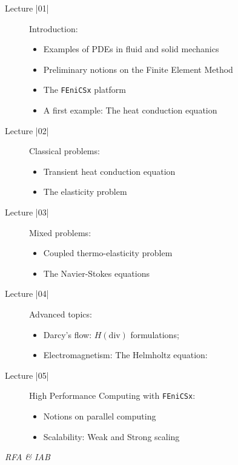 \begin{description}
	\item[Lecture |01|] Introduction:
	\begin{itemize}
		\item Examples of PDEs in fluid and solid mechanics
		\item Preliminary notions on the Finite Element Method
		\item The \texttt{FEniCSx} platform
		\item A first example: The heat conduction equation
	\end{itemize}
	
	\item[Lecture |02|] Classical problems:
	\begin{itemize}
		\item Transient heat conduction equation
		\item The elasticity problem
	\end{itemize}
	
	\item[Lecture |03|] Mixed problems:
	\begin{itemize}
		\item Coupled thermo-elasticity problem
		\item The Navier-Stokes equations
	\end{itemize}
	
	\item[Lecture |04|] Advanced topics: 
	
	\begin{itemize}
		\item Darcy's flow: $H(\mbox{div})$ formulations;
		\item Electromagnetism: The Helmholtz equation: 
	\end{itemize}
	
	\item[Lecture |05|] High Performance Computing with \texttt{FEniCSx}:
	
	\begin{itemize}
		\item Notions on parallel computing
		\item Scalability: Weak and Strong scaling
	\end{itemize}
	
\end{description}

\begin{flushright}
	\textit{RFA \& IAB} 
\end{flushright}
